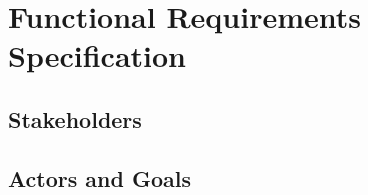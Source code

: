 \chapter{Functional Requirements Specification}


\section{Stakeholders}


\section{Actors and Goals}



\iffalse
\begin{figure}
\centering
\texttt{[image: ./Diagrams/UseCaseDiagram.png]}
\caption{This graphic illustrates the relationships between the core actors of our platform.}
\end{figure}

\section{Use Cases}



\section{System Sequence Diagrams}


\fi
